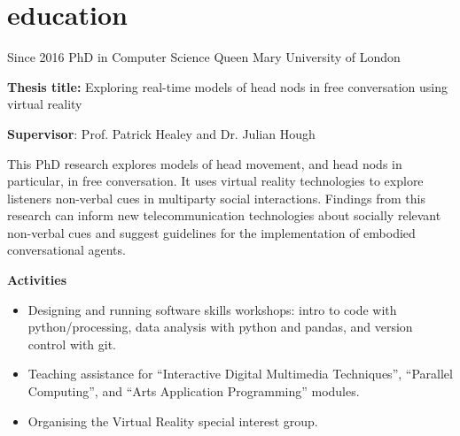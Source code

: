 \documentclass[]{friggeri-cv}
\begin{document}

\section{education}

\begin{entrylist}

    \entry
    {Since 2016}
    {PhD in Computer Science}
    {Queen Mary University of London}
    {
      \textbf{Thesis title:} Exploring real-time models of head nods in free conversation using virtual reality

      \textbf{Supervisor}: Prof. Patrick Healey and Dr. Julian Hough

      This PhD research explores models of head movement, and head nods in particular, in free conversation.
      It uses virtual reality technologies to explore listeners non-verbal cues in multiparty social interactions.
      Findings from this research can inform new telecommunication technologies about socially relevant non-verbal cues and suggest guidelines for the implementation of embodied conversational agents.

      \textbf{Activities}
      \begin{itemize}
        \item
          Designing and running software skills workshops: intro to code with python/processing, data analysis with python and pandas, and version control with git.
        \item
          Teaching assistance for ``Interactive Digital Multimedia Techniques'', ``Parallel Computing'', and ``Arts Application Programming'' modules.
        \item
          Organising the Virtual Reality special interest group.
      \end{itemize}
    }

\end{entrylist}
\end{document}
